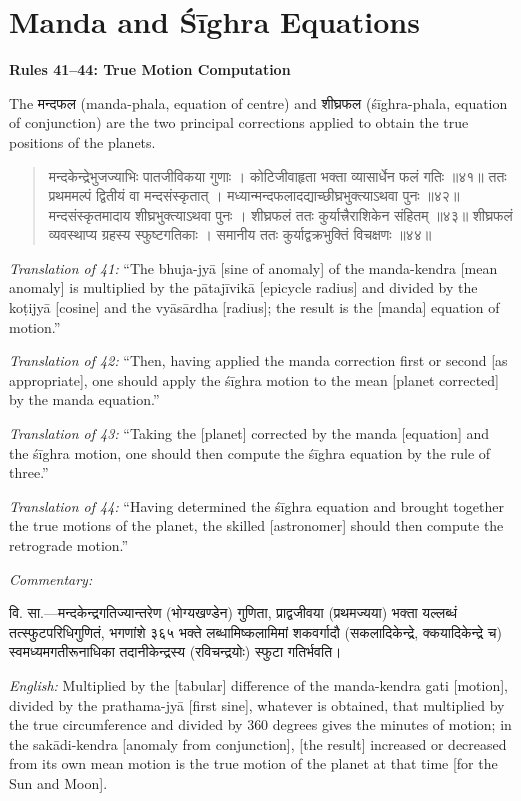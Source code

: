 \documentclass[11pt,a4paper]{book}
\newcommand{\dev}[1]{{\devanagarifont #1}}
\newenvironment{shloka}{%
  \begin{verse}
  \devanagarifont\color{versecolor}%
}{\end{verse}}
\newenvironment{vasaanaskt}{%
  \par\vspace{0.5em}\noindent\small\textit{Commentary:}%
}{\par\vspace{0.5em}}
\newcommand{\ruleheading}[1]{%
  \par\vspace{0.8em}\noindent\textbf{\color{sectioncolor}#1}\par\vspace{0.3em}%
}
\begin{document}
\clearpage

\section{Manda and Śīghra Equations}

\ruleheading{Rules 41--44: True Motion Computation}

\noindent
The \dev{मन्दफल} (manda-phala, equation of centre) and \dev{शीघ्रफल} (śīghra-phala, equation of conjunction) are the two principal corrections applied to obtain the true positions of the planets.

\begin{shloka}
\begin{altverse}
\dev{मन्दकेन्द्रेभुजज्याभिः पातजीविकया गुणाः ।}
\dev{कोटिजीवाहृता भक्ता व्यासार्धेन फलं गतिः ॥४१॥}
\dev{ततः प्रथममल्पं द्वितीयं वा मन्दसंस्कृतात् ।}
\dev{मध्यान्मन्दफलादद्याच्छीघ्रभुक्त्याऽथवा पुनः ॥४२॥}
\dev{मन्दसंस्कृतमादाय शीघ्रभुक्त्याऽथवा पुनः ।}
\dev{शीघ्रफलं ततः कुर्यात्त्रैराशिकेन संहितम् ॥४३॥}
\dev{शीघ्रफलं व्यवस्थाप्य ग्रहस्य स्फुष्टगतिकाः ।}
\dev{समानीय ततः कुर्याद्वक्रभुक्तिं विचक्षणः ॥४४॥}
\end{altverse}
\end{shloka}

\textit{Translation of 41:} ``The bhuja-jyā [sine of anomaly] of the manda-kendra [mean anomaly] is multiplied by the pātajīvikā [epicycle radius] and divided by the koṭijyā [cosine] and the vyāsārdha [radius]; the result is the [manda] equation of motion.''

\textit{Translation of 42:} ``Then, having applied the manda correction first or second [as appropriate], one should apply the śīghra motion to the mean [planet corrected] by the manda equation.''

\textit{Translation of 43:} ``Taking the [planet] corrected by the manda [equation] and the śīghra motion, one should then compute the śīghra equation by the rule of three.''

\textit{Translation of 44:} ``Having determined the śīghra equation and brought together the true motions of the planet, the skilled [astronomer] should then compute the retrograde motion.''

\begin{vasaanaskt}
\dev{वि. सा.}---मन्दकेन्द्रगतिज्यान्तरेण (भोग्यखण्डेन) गुणिता, प्राद्वजीवया (प्रथमज्यया) भक्ता यल्लब्धं तत्स्फुटपरिधिगुणितं, भगणांशे ३६५ भक्ते लब्धामिष्कलामिमां शकवर्गादौ (सकलादिकेन्द्रे, क्कयादिकेन्द्रे च) स्वमध्यमगतीरूनाधिका तदानीकेन्द्रस्य (रविचन्द्रयोः) स्फुटा गतिर्भवति।

\textit{English:} Multiplied by the [tabular] difference of the manda-kendra gati [motion], divided by the prathama-jyā [first sine], whatever is obtained, that multiplied by the true circumference and divided by 360 degrees gives the minutes of motion; in the sakādi-kendra [anomaly from conjunction], [the result] increased or decreased from its own mean motion is the true motion of the planet at that time [for the Sun and Moon].
\end{vasaanaskt}
\end{document}

